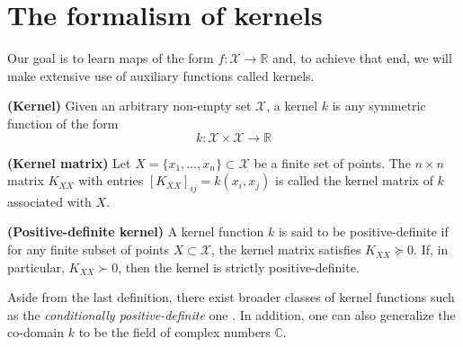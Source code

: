 \section{The formalism of kernels}
\label{sec.formalism_of_kernels}

Our goal is to learn maps of the form $f: \mathcal{X} \rightarrow \mathbb{R}$ and, to achieve that end, we will make extensive use of auxiliary functions called kernels.

\begin{definition}
	\textbf{(Kernel)} Given an arbitrary non-empty set $\mathcal{X}$, a kernel $k$ is any symmetric function of the form
	\begin{equation}
		k: \mathcal{X} \times \mathcal{X} \rightarrow \mathbb{R}
	\end{equation}
\end{definition}

\begin{definition}
	\textbf{(Kernel matrix)} Let $X = \{x_1,\dots,x_n\} \subset \mathcal{X}$ be a finite set of points. The $n \times n$ matrix $K_{XX}$ with entries $[K_{XX}]_{ij} = k(x_i,x_j)$ is called the kernel matrix of $k$ associated with $X$.
\end{definition}

\begin{definition}
	\label{def.pd_kernel}
	\textbf{(Positive-definite kernel)} A kernel function $k$ is said to be positive-definite if for any finite subset of points $X \subset \mathcal{X}$, the kernel matrix satisfies $K_{XX} \succeq 0$. If, in particular, $K_{XX} \succ 0$, then the kernel is strictly positive-definite.
\end{definition}

\begin{remark}
	Aside from the last definition, there exist broader classes of kernel functions such as the \textit{conditionally positive-definite} one \cite[§2.4]{scholkopf2002learning}\cite[§8]{wendland2004scattered}. In addition, one can also generalize the co-domain $k$ to be the field of complex numbers $\mathbb{C}$.
\end{remark}

